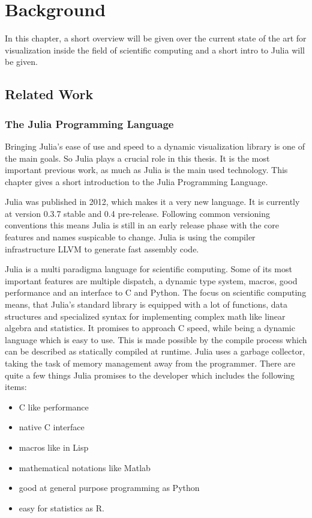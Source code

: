 \section{Background}

In this chapter, a short overview will be given over the current state of the art for visualization inside the field of scientific computing and a short intro to Julia will be given.

\subsection{Related Work}

\subsubsection{The Julia Programming Language}

Bringing Julia's ease of use and speed to a dynamic visualization library is one of the main goals.
So Julia plays a crucial role in this thesis. 
It is the most important previous work, as much as Julia is the main used technology.
This chapter gives a short introduction to the Julia Programming Language.

Julia was published in 2012, which makes it a very new language. It is currently at version 0.3.7 stable and 0.4 pre-release.
Following common versioning conventions this means Julia is still in an early release phase with the core features and names suspicable to change.
Julia is using the compiler infrastructure \ac{LLVM} to generate fast assembly code.

Julia is a multi paradigma language for scientific computing. 
Some of its most important features are multiple dispatch, a dynamic type system, macros, good performance and an interface to C and Python.
The focus on scientific computing means, that Julia's standard library is equipped with a lot of functions, data structures and specialized syntax for implementing complex math like linear algebra and statistics.
It promises to approach C speed, while being a dynamic language which is easy to use.
This is made possible by the compile process which can be described as statically compiled at runtime.
Julia uses a garbage collector, taking the task of memory management away from the programmer.
There are quite a few things Julia promises to the developer which includes the following items\cite{WhyJulia}:

\begin{itemize}
	\item C like performance
	\item native C interface
	\item macros like in Lisp
	\item mathematical notations like Matlab
	\item good at general purpose programming as Python
	\item easy for statistics as R.
\end{itemize}

